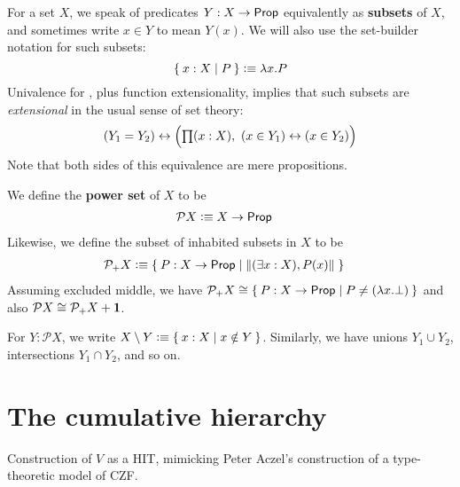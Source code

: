 For a set $X$, we speak of predicates $Y:X\to \mathsf{Prop}$ equivalently as \textbf{subsets} of $X$, and sometimes write $x\in Y$ to mean $Y(x)$.
We will also use the set-builder notation for such subsets:
\[ \Set{x:X | P } \vcentcolon\equiv \lambda x.P \]
Univalence for \prop, plus function extensionality, implies that such subsets are \emph{extensional} in the usual sense of set theory:
\[ (Y_1 = Y_2) \leftrightarrow \Big(\prd{x:X} (x\in Y_1) \leftrightarrow (x\in Y_2)\Big) \]
Note that both sides of this equivalence are mere propositions.

We define the \textbf{power set} of $X$ to be
\begin{align*}
  \mathcal{P} X &\vcentcolon\equiv X\to \mathsf{Prop}
\end{align*}
Likewise, we define the subset of inhabited subsets in $X$ to be
\begin{align*}
  \mathcal{P}_+ X &\defeq \setof{P:X\to \prop | \brck{(\exists x:X), P(x)}}
\end{align*}
Assuming excluded middle, we have $\mathcal{P}_+ X \cong \setof{P:X\to \prop | P \neq (\lambda x.\bot)}$ and also $\mathcal{P} X \cong \mathcal{P}_+ X + \mathbf{1}$.

For $Y:\mathcal{P}X$, we write $X\setminus Y \vcentcolon\equiv \Set{x:X | x\notin Y}$.
Similarly, we have unions $Y_1 \cup Y_2$, intersections $Y_1 \cap Y_2$, and so on.

\section{The cumulative hierarchy}
\label{sec:cumulative-hierarchy}

Construction of $V$ as a HIT, mimicking Peter Aczel's construction of a type-theoretic
model of CZF.




